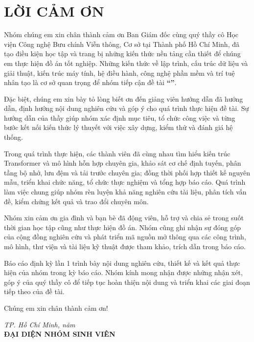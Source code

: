 \chapter*{LỜI CẢM ƠN}

Nhóm chúng em xin chân thành cảm ơn Ban Giám đốc cùng quý thầy cô Học viện Công nghệ Bưu chính Viễn thông, Cơ sở tại Thành phố Hồ Chí Minh, đã tạo điều kiện học tập và trang bị những kiến thức nền tảng cần thiết để chúng em thực hiện đồ án tốt nghiệp. Những kiến thức về lập trình, cấu trúc dữ liệu và giải thuật, kiến trúc máy tính, hệ điều hành, công nghệ phần mềm và trí tuệ nhân tạo là cơ sở quan trọng để nhóm tiếp cận đề tài \textbf{``\reporttitle''}.

Đặc biệt, chúng em xin bày tỏ lòng biết ơn đến giảng viên hướng dẫn \textbf{\reportsupervisor} đã hướng dẫn, định hướng nội dung nghiên cứu và góp ý cho quá trình thực hiện đề tài. Sự hướng dẫn của thầy giúp nhóm xác định mục tiêu, tổ chức công việc và từng bước kết nối kiến thức lý thuyết với việc xây dựng, kiểm thử và đánh giá hệ thống.

Trong quá trình thực hiện, các thành viên đã cùng nhau tìm hiểu kiến trúc Transformer và mô hình hỗn hợp chuyên gia, khảo sát cơ chế định tuyến, phân tầng bộ nhớ, lưu đệm và tải trước chuyên gia; đồng thời phối hợp thiết kế nguyên mẫu, triển khai chức năng, tổ chức thực nghiệm và tổng hợp báo cáo. Quá trình làm việc chung giúp nhóm rèn luyện khả năng nghiên cứu tài liệu, phân tích vấn đề, kiểm chứng kết quả và trao đổi chuyên môn.

Nhóm xin cảm ơn gia đình và bạn bè đã động viên, hỗ trợ và chia sẻ trong suốt thời gian học tập cũng như thực hiện đồ án. Nhóm cũng ghi nhận sự đóng góp của cộng đồng nghiên cứu và phát triển mã nguồn mở thông qua các công trình, mô hình, thư viện và tài liệu kỹ thuật được tham khảo, trích dẫn trong báo cáo.

Báo cáo định kỳ lần 1 trình bày nội dung nghiên cứu, thiết kế và kết quả thực hiện của nhóm trong kỳ báo cáo. Nhóm kính mong nhận được những nhận xét, góp ý của quý thầy cô để tiếp tục hoàn thiện nội dung và triển khai các giai đoạn tiếp theo của đề tài.

Chúng em xin chân thành cảm ơn!

\vspace{0.5cm}
\begin{flushright}
\textit{TP. Hồ Chí Minh, năm \reportyear}\\[0.2cm]
\textbf{ĐẠI DIỆN NHÓM SINH VIÊN}\\[1.2cm]
\textbf{\reportrepresentative}
\end{flushright}

